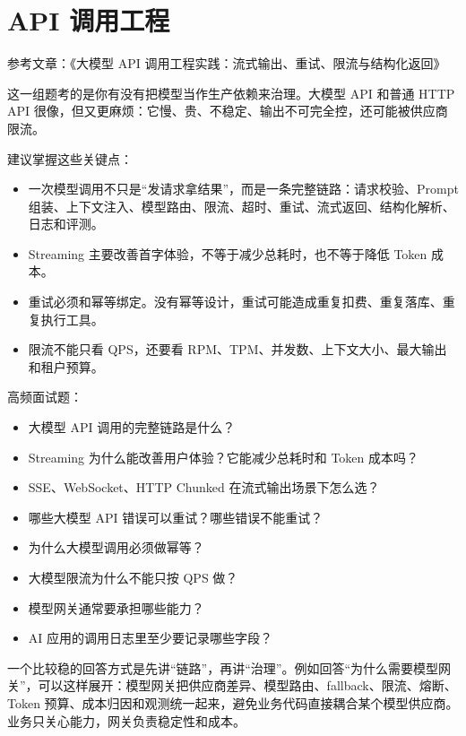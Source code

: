 \documentclass[9pt,a4paper,twocolumn]{ctexart}
\begin{document}
\section*{API 调用工程}


参考文章：《大模型 API 调用工程实践：流式输出、重试、限流与结构化返回》



这一组题考的是你有没有把模型当作生产依赖来治理。大模型 API 和普通 HTTP API 很像，但又更麻烦：它慢、贵、不稳定、输出不可完全控，还可能被供应商限流。



建议掌握这些关键点：


\begin{itemize}[itemsep=1pt, topsep=2pt]
  \item 一次模型调用不只是“发请求拿结果”，而是一条完整链路：请求校验、Prompt 组装、上下文注入、模型路由、限流、超时、重试、流式返回、结构化解析、日志和评测。
  \item Streaming 主要改善首字体验，不等于减少总耗时，也不等于降低 Token 成本。
  \item 重试必须和幂等绑定。没有幂等设计，重试可能造成重复扣费、重复落库、重复执行工具。
  \item 限流不能只看 QPS，还要看 RPM、TPM、并发数、上下文大小、最大输出和租户预算。
\end{itemize}


高频面试题：


\begin{itemize}[itemsep=1pt, topsep=2pt]
  \item 大模型 API 调用的完整链路是什么？
  \item Streaming 为什么能改善用户体验？它能减少总耗时和 Token 成本吗？
  \item SSE、WebSocket、HTTP Chunked 在流式输出场景下怎么选？
  \item 哪些大模型 API 错误可以重试？哪些错误不能重试？
  \item 为什么大模型调用必须做幂等？
  \item 大模型限流为什么不能只按 QPS 做？
  \item 模型网关通常要承担哪些能力？
  \item AI 应用的调用日志里至少要记录哪些字段？
\end{itemize}


一个比较稳的回答方式是先讲“链路”，再讲“治理”。例如回答“为什么需要模型网关”，可以这样展开：模型网关把供应商差异、模型路由、fallback、限流、熔断、Token 预算、成本归因和观测统一起来，避免业务代码直接耦合某个模型供应商。业务只关心能力，网关负责稳定性和成本。
\end{document}

